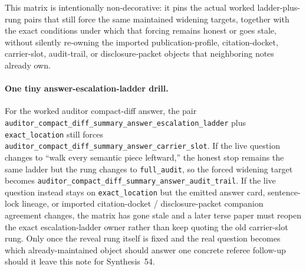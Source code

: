 \documentclass[11pt]{article}
\begin{document}
This matrix is intentionally non-decorative: it pins the actual worked ladder-plus-rung pairs that still force the same maintained widening targets, together with the exact conditions under which that forcing remains honest or goes stale, without silently re-owning the imported publication-profile, citation-docket, carrier-slot, audit-trail, or disclosure-packet objects that neighboring notes already own.\cite{series:workedexample}

\paragraph{One tiny answer-escalation-ladder drill.}
For the worked auditor compact-diff answer, the pair \nolinkurl{auditor_compact_diff_summary_answer_escalation_ladder} plus \nolinkurl{exact_location} still forces \nolinkurl{auditor_compact_diff_summary_answer_carrier_slot}. If the live question changes to ``walk every semantic piece leftward,'' the honest stop remains the same ladder but the rung changes to \nolinkurl{full_audit}, so the forced widening target becomes \nolinkurl{auditor_compact_diff_summary_answer_audit_trail}. If the live question instead stays on \nolinkurl{exact_location} but the emitted answer card, sentence-lock lineage, or imported citation-docket / disclosure-packet companion agreement changes, the matrix has gone stale and a later terse paper must reopen the exact escalation-ladder owner rather than keep quoting the old carrier-slot rung. Only once the reveal rung itself is fixed and the real question becomes which already-maintained object should answer one concrete referee follow-up should it leave this note for Synthesis~54.\cite{series:workedexample}
\end{document}

